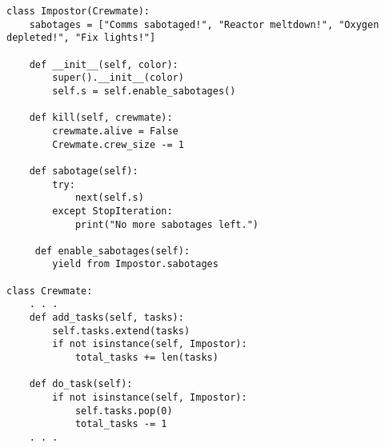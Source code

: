 \begin{solution}
\begin{lstlisting}
class Impostor(Crewmate):
    sabotages = ["Comms sabotaged!", "Reactor meltdown!", "Oxygen depleted!", "Fix lights!"]
    
    def __init__(self, color):
        super().__init__(color)
        self.s = self.enable_sabotages()
    
    def kill(self, crewmate):
        crewmate.alive = False
        Crewmate.crew_size -= 1
    
    def sabotage(self):
        try:
            next(self.s)
        except StopIteration:
            print("No more sabotages left.")
     
     def enable_sabotages(self):
     	yield from Impostor.sabotages

class Crewmate:
    . . .
    def add_tasks(self, tasks):
        self.tasks.extend(tasks)
        if not isinstance(self, Impostor):
            total_tasks += len(tasks)
    
    def do_task(self):
        if not isinstance(self, Impostor):
            self.tasks.pop(0)
            total_tasks -= 1
    . . .
\end{lstlisting}
\end{solution}

